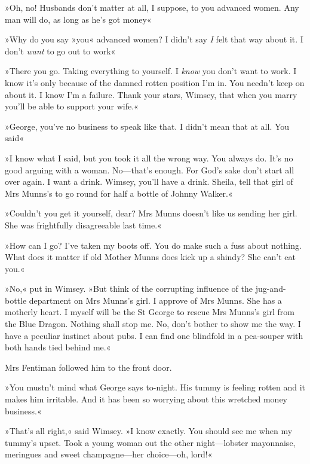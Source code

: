 »Oh, no! Husbands don't matter at all, I suppose, to you advanced women. Any man will do, as long as he's got money\longdash«

»Why do you say »you« advanced women? I didn't say \textit{I} felt that way about it. I don't \textit{want} to go out to work\longdash«

»There you go. Taking everything to yourself. I \textit{know} you don't want to work. I know it's only because of the damned rotten position I'm in. You needn't keep on about it. I know I'm a failure. Thank your stars, Wimsey, that when you marry you'll be able to support your wife.«

»George, you've no business to speak like that. I didn't mean that at all. You said\longdash«

»I know what I said, but you took it all the wrong way. You always do. It's no good arguing with a woman. No\allowbreak---\allowbreak that's enough. For God's sake don't start all over again. I want a drink. Wimsey, you'll have a drink. Sheila, tell that girl of Mrs Munns's to go round for half a bottle of Johnny Walker.«

»Couldn't you get it yourself, dear? Mrs Munns doesn't like us sending her girl. She was frightfully disagreeable last time.«

»How can I go? I've taken my boots off. You do make such a fuss about nothing. What does it matter if old Mother Munns does kick up a shindy? She can't eat you.«

»No,« put in Wimsey. »But think of the corrupting influence of the jug-and-bottle department on Mrs Munns's girl. I approve of Mrs Munns. She has a motherly heart. I myself will be the St George to rescue Mrs Munns's girl from the Blue Dragon. Nothing shall stop me. No, don't bother to show me the way. I have a peculiar instinct about pubs. I can find one blindfold in a pea-souper with both hands tied behind me.«

Mrs Fentiman followed him to the front door.

»You mustn't mind what George says to-night. His tummy is feeling rotten and it makes him irritable. And it has been so worrying about this wretched money business.«

»That's all right,« said Wimsey. »I know exactly. You should see me when my tummy's upset. Took a young woman out the other night\allowbreak---\allowbreak lobster mayonnaise, meringues and sweet champagne\allowbreak---\allowbreak her choice\allowbreak---\allowbreak oh, lord!«

